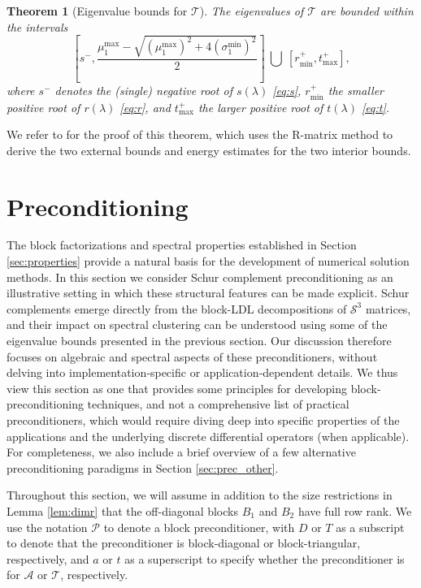 \documentclass{article}
\newtheorem{theorem}{Theorem}
\newcommand{\st}{\mathcal{S}^3}
\newcommand{\sA}{\mathcal{A}}
\newcommand{\sT}{\mathcal{T}}
\begin{document}
\begin{theorem}[Eigenvalue bounds for $\sT$]
    The eigenvalues of $\sT$ are bounded within the intervals
    \[
	\left[s^-, \frac{\mu^{\max}_{1} - \sqrt{(\mu^{\max}_{1})^2 + 4(\sigma^{\min}_{1})^2}}{2} \right] \ \bigcup \ \left[ r^+_{\min}, t^+_{\max} \right],
	\]
    where $s^-$ denotes the (single) negative root of $s(\lambda)$ \eqref{eq:s}, $r^+_{\min}$ the smaller positive root of $r(\lambda)$ \eqref{eq:r}, and $t^+_{\max}$ the larger positive root of $t(\lambda)$ \eqref{eq:t}.
\end{theorem}

We refer to \cite{bg22} for the proof of this theorem, which uses the R-matrix method to derive the two external bounds and energy estimates for the two interior bounds.




\section{Preconditioning}
\label{sec:iter-prec}
The block factorizations and spectral properties established in Section  \ref{sec:properties} provide a natural basis for the development of numerical solution methods. In this section we consider Schur complement preconditioning as an illustrative setting in which these structural features can be made explicit. Schur complements emerge directly from the block-LDL decompositions of $\st$ matrices, and their impact on spectral clustering can be understood using some of the eigenvalue bounds presented in the previous section. Our discussion therefore focuses on algebraic and spectral aspects of these preconditioners, without delving into implementation‑specific or application‑dependent details. We thus view  this section as one that provides some principles for developing block-preconditioning techniques, and not a comprehensive list of practical preconditioners, which would require 
diving deep into specific properties of the applications and the underlying discrete differential operators (when applicable). For completeness, we also include a brief overview of a few alternative preconditioning paradigms in Section \ref{sec:prec_other}.

Throughout this section, we will assume in addition to the size restrictions in Lemma \ref{lem:dimr} that the off-diagonal blocks $B_1$ and $B_2$ have full row rank. We use the notation $\mathcal{P}$ to denote a block preconditioner, with $D$ or $T$ as a subscript to denote that the preconditioner is block-diagonal or block-triangular, respectively, and $a$ or $t$ as a superscript to specify whether the preconditioner is for $\sA$ or $\sT$, respectively.
\end{document}

